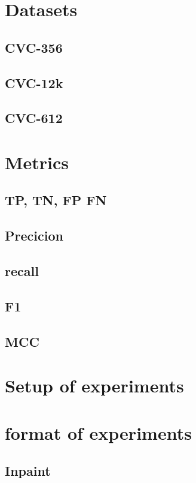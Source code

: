 \section{Datasets}
    
    \subsection{CVC-356}
    \subsection{CVC-12k}
    \subsection{CVC-612}

\section{Metrics}
    \subsection{TP, TN, FP FN}
    \subsection{Precicion}
    \subsection{recall}
    \subsection{F1}
    \subsection{MCC}
    
\section{Setup of experiments}

\section{format of experiments}
    \subsection{Inpaint}
